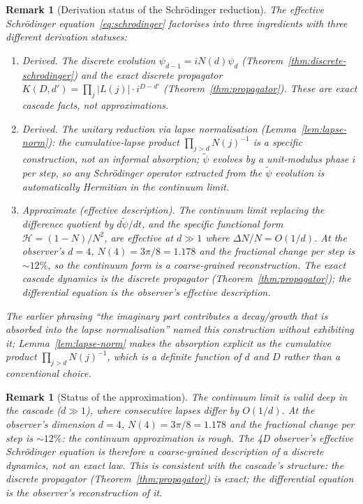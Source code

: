 \documentclass[12pt,a4paper]{article}
\newtheorem{remark}[theorem]{Remark}
\begin{document}
\begin{remark}[Derivation status of the Schr\"{o}dinger reduction]\label{rem:sp18-status}
The effective Schr\"{o}dinger equation~\eqref{eq:schrodinger} factorises
into three ingredients with three different derivation statuses:
\begin{enumerate}
\item \emph{Derived.} The discrete evolution
$\psi_{d-1} = iN(d)\psi_d$ (Theorem~\ref{thm:discrete-schrodinger})
and the exact discrete propagator
$K(D,d') = \prod_j|L(j)|\cdot i^{D-d'}$
(Theorem~\ref{thm:propagator}). These are exact cascade facts, not
approximations.
\item \emph{Derived.} The unitary reduction via lapse normalisation
(Lemma~\ref{lem:lapse-norm}): the cumulative-lapse product
$\prod_{j>d}N(j)^{-1}$ is a specific construction, not an informal
absorption; $\tilde\psi$ evolves by a unit-modulus phase $i$ per step,
so any Schr\"{o}dinger operator extracted from the $\tilde\psi$
evolution is automatically Hermitian in the continuum limit.
\item \emph{Approximate (effective description).} The continuum limit
replacing the difference quotient by $d\tilde\psi/dt$, and the
specific functional form $\mathcal{H} = (1-N)/N^2$, are effective at
$d\gg 1$ where $\Delta N/N = O(1/d)$. At the observer's
$d = 4$, $N(4) = 3\pi/8 = 1.178$ and the fractional change per
step is $\sim 12\%$, so the continuum form is a coarse-grained
reconstruction. The exact cascade dynamics is the discrete propagator
(Theorem~\ref{thm:propagator}); the differential equation is the
observer's effective description.
\end{enumerate}
The earlier phrasing ``the imaginary part contributes a
decay/growth that is absorbed into the lapse normalisation'' named
this construction without exhibiting it; Lemma~\ref{lem:lapse-norm}
makes the absorption explicit as the cumulative product
$\prod_{j>d} N(j)^{-1}$, which is a definite function of $d$ and $D$
rather than a conventional choice.
\end{remark}

\begin{remark}[Status of the approximation]
The continuum limit is valid deep in the cascade ($d\gg 1$), where consecutive lapses
differ by $O(1/d)$. At the observer's dimension $d=4$, $N(4) = 3\pi/8 = 1.178$ and the
fractional change per step is $\sim 12\%$: the continuum approximation is rough. The
4D observer's effective Schr\"{o}dinger equation is therefore a coarse-grained description
of a discrete dynamics, not an exact law. This is consistent with the cascade's structure:
the discrete propagator (Theorem~\ref{thm:propagator}) is exact; the differential equation
is the observer's reconstruction of it.
\end{remark}
\end{document}
